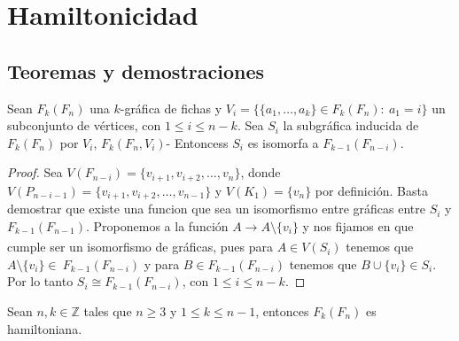 \chapter{Hamiltonicidad}%
\label{cap:hamilt}

\section{Teoremas y demostraciones}%

\begin{proposicion}
        \label{prop:iso-SFan}
            Sean $F_k(F_n)$ una $k$-gr\'afica de fichas y $V_i=\{\{a_1, \dots, a_k\}
            \in F_k(F_n) \colon\ a_1 = i\}$ un subconjunto de v\'ertices, con $1
            \leq i \leq n-k$. Sea $S_i$ la subgr\'afica inducida de $F_k(F_n)$ por
            $V_i$, $F_k(F_n, V_i)$- Entoncess $S_i$ es isomorfa a $F_{k-1}(F_{n-i})$.
        \end{proposicion}
    
        \begin{proof}
            Sea $V(F_{n-i}) = \{v_{i+1}, v_{i+2}, \dots, v_n\}$, donde $V(P_{n-i-1})
            = \{v_{i+1}, v_{i+2}, \dots, v_{n-1}\}$ y $V(K_1)= \{v_n\}$ por
            definici\'on. Basta demostrar que existe una funcion que sea un
            isomorfismo entre gr\'aficas entre $S_i$ y $F_{k-1}(F_{n-1})$.
            Proponemos a la funci\'on $A \xrightarrow[]{} A \setminus \{v_i\}$ y nos
            fijamos en que cumple ser un isomorfismo de gr\'aficas, pues para $A \in
            V(S_i)$ tenemos que $A \setminus \{v_i\} \in \ F_{k-1}(F_{n-i})$  y para
            $B \in F_{k-1}(F_{n-i})$ tenemos que $B \cup \{v_i\} \in S_i$. Por lo
            tanto $S_i \cong F_{k-1}(F_{n-i})$, con $1 \leq i \leq n-k$.
            
        \end{proof}
    
        \begin{teorema}
        \label{teo:hamilt-SFan}
            Sean $n,k \in \mathbb{Z}$ tales que $n \geq 3$ y $1 \leq k \leq n-1$,
            entonces $F_k(F_n)$ es hamiltoniana.
        \end{teorema}
    
